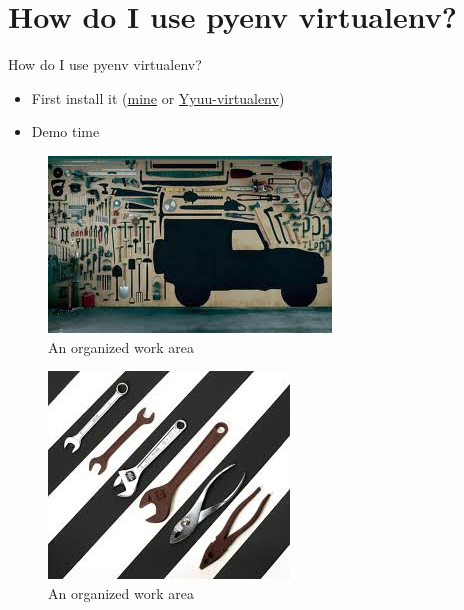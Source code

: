 \documentclass[bigger]{beamer}
\begin{document}
\section{How do I use pyenv virtualenv?}
\label{sec-7}
\begin{frame}[label=sec-7-1]{How do I use pyenv virtualenv?}
\begin{itemize}
\item First install it (\href{http://mofj.commons.gc.cuny.edu/2014/01/20/ubuntu-set-up-a-virtual-environment-with-ipython-numpy-and-pandas/}{mine} or \href{https://github.com/yyuu/pyenv-virtualenv}{Yyuu-virtualenv})
\item Demo time
\end{itemize}
\end{frame}
\begin{frame}[label=sec-7-2]{}
\begin{figure}[htb]
\centering
\includegraphics[width=.9\linewidth]{./images/garage.jpeg}
\caption{An organized work area}
\end{figure}
\end{frame}

\begin{frame}[label=sec-7-3]{}
\begin{figure}[htb]
\centering
\includegraphics[width=.9\linewidth]{./images/sepTools.jpeg}
\caption{An organized work area}
\end{figure}
\end{frame}
\end{document}
